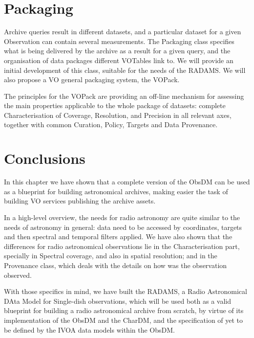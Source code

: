 	\section{Packaging} %
		
		Archive queries result in different datasets, and a
		particular dataset for a given Observation can contain
		several measurements. The Packaging class specifies what is
		being delivered by the archive as a result for a given
		query, and the organisation of data packages different
		VOTables link to. We will provide an initial development of
		this class, suitable for the needs of the RADAMS. We will
		also propose a VO general packaging system, the VOPack.
		
		The principles for the VOPack are providing an off-line
		mechanism for assessing the main properties applicable to
		the whole package of datasets: complete Characterisation of
		Coverage, Resolution, and Precision in all relevant axes,
		together with common Curation, Policy, Targets and
		Data Provenance.
		
	
	\section{Conclusions} %
	\label{sub:radams_conclusions}
		
		In this chapter we have shown that a complete version of
		the ObsDM can be used as a blueprint for building
		astronomical archives, making easier the task of building
		VO services publishing the archive assets.
		
		In a high-level overview, the needs for radio astronomy
		are quite similar to the needs of astronomy in general:
		data need to be accessed by coordinates, targets and
		then spectral and temporal filters applied. We have also
		shown that the differences for radio astronomical
		observations lie in the Characterisation part, specially
		in Spectral coverage, and also in spatial resolution; and
		in the Provenance class, which deals with the details on
		how was the observation observed.
		
		With those specifics in mind, we have built the RADAMS, a
		Radio Astronomical DAta Model for Single-dish observations,
		which will be used both as a valid blueprint for building a
		radio astronomical archive from scratch, by virtue of its
		implementation of the ObsDM and the CharDM, and the
		specification of yet to be defined by the IVOA data models
		within the ObsDM.
		
